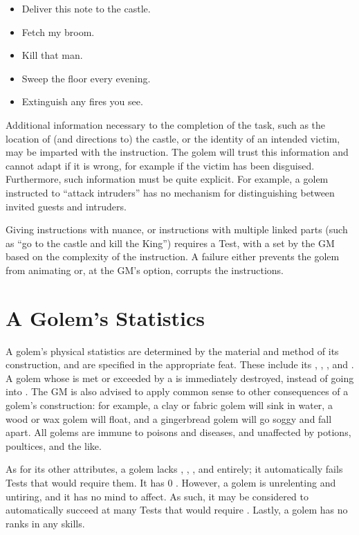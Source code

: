 \begin{itemize}
	\item Deliver this note to the castle.
	\item Fetch my broom.
	\item Kill that man.
	\item Sweep the floor every evening.
	\item Extinguish any fires you see.
\end{itemize}

Additional information necessary to the completion of the task, such as the location of (and directions to) the castle, or the identity of an intended victim, may be imparted with the instruction.
The golem will trust this information and cannot adapt if it is wrong, for example if the victim has been disguised.
Furthermore, such information must be quite explicit.
For example, a golem instructed to ``attack intruders'' has no mechanism for distinguishing between invited guests and intruders.

Giving instructions with nuance, or instructions with multiple linked parts (such as ``go to the castle and kill the King'') requires a Test, with a {\tn} set by the GM based on the complexity of the instruction.
A failure either prevents the golem from animating or, at the GM's option, corrupts the instructions.

\section{A Golem's Statistics}

A golem's physical statistics are determined by the material and method of its construction, and are specified in the appropriate feat.
These include its , , ,  and .
A golem whose  is met or exceeded by a {\damagetest} is immediately destroyed, instead of going into {\shock}.
The GM is also advised to apply common sense to other consequences of a golem's construction: for example, a clay or fabric golem will sink in water, a wood or wax golem will float, and a gingerbread golem will go soggy and fall apart.
All golems are immune to poisons and diseases, and unaffected by potions, poultices, and the like.

As for its other attributes, a golem lacks , , ,  and  entirely; it automatically fails Tests that would require them.
It has 0 .
However, a golem is unrelenting and untiring, and it has no mind to affect.
As such, it may be considered to automatically succeed at many Tests that would require .
Lastly, a golem has no ranks in any skills.

